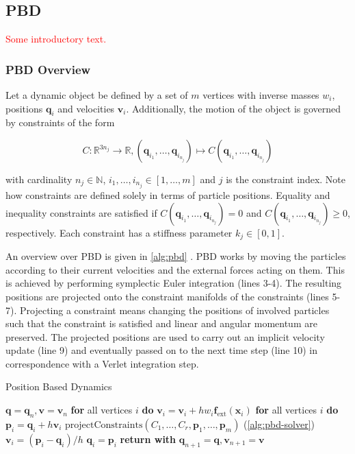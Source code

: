 \subsection{PBD}\label{ss:pbd}
\textcolor{red}{Some introductory text.}

\subsubsection{PBD Overview}\label{sss:pbd-overview}
Let a dynamic object be defined by a set of $m$ vertices with inverse masses $w_i$, positions $\bm{q}_i$ and velocities $\bm{v}_i$. Additionally, the motion
of the object is governed by constraints of the form 

\[
C \colon \mathbb{R}^{3n_j} \to \mathbb{R}, (\bm{q}_{i_1}, \ldots, \bm{q}_{i_{n_j}}) \mapsto C(\bm{q}_{i_1}, \ldots, \bm{q}_{i_{n_j}})
\]

\noindent with cardinality $n_j \in \mathbb{N}$, $i_1, \ldots, i_{n_j} \in [1, \ldots, m]$ and $j$ is the constraint index. Note how constraints 
are defined solely in terms of particle positions. Equality and inequality constraints are satisfied if 
$C(\bm{q}_{i_1}, \ldots, \bm{q}_{i_{n_j}}) = 0$ and $C(\bm{q}_{i_1}, \ldots, \bm{q}_{i_{n_j}}) \geq 0$, respectively. Each constraint has a stiffness 
parameter $k_j \in [0,1]$. 

An overview over PBD is given in \cref{alg:pbd} \cite{mueller2006}. PBD works by moving the particles according to their current velocities and the external forces acting 
on them. This is achieved by performing symplectic Euler integration (lines 3-4). The resulting positions 
are projected onto the constraint manifolds of the constraints (lines 5-7). Projecting a constraint means changing the positions of involved particles 
such that the constraint is satisfied and linear and angular momentum are preserved. The projected positions are used to carry out an implicit 
velocity update (line 9) and eventually passed on to the next time step (line 10) in correspondence with a Verlet integration step.

\begin{algorithm}
\caption{Position Based Dynamics}\label{alg:pbd}
\begin{algorithmic}[1]
\State $\bm{q} = \bm{q}_n, \bm{v} = \bm{v}_n$
\State \textbf{for} all vertices $i$ \textbf{do} $\bm{v}_i = \bm{v}_i + hw_i\bm{f}_{\text{ext}}(\bm{x}_i)$
\State \textbf{for} all vertices $i$ \textbf{do} $\bm{p}_i = \bm{q}_i + h\bm{v}_i$
\State $\text{projectConstraints}(C_1, \ldots, C_r, \bm{p}_1, \ldots, \bm{p}_m)$ (\cref{alg:pbd-solver})
\EndFor
{}
\State $\bm{v}_i = (\bm{p}_i - \bm{q}_i) / h$
\State $\bm{q}_i = \bm{p}_i$
\EndFor
\State \textbf{return with } $\bm{q}_{n+1} = \bm{q}, \bm{v}_{n+1} = \bm{v}$
\EndProcedure
\end{algorithmic}
\end{algorithm}

